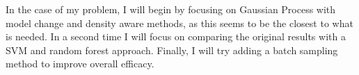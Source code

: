 \documentclass[11pt]{article}
\begin{document}
In the case of my problem, I will begin by focusing on Gaussian Process with model change and density aware methods, as this seems to be the closest to what is needed. In a second time I will focus on comparing the original results with a SVM and random forest approach. Finally, I will try adding a batch sampling method to improve overall efficacy.

\end{document}
